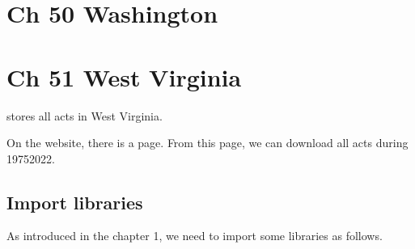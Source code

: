 \documentclass[letterpaper,10pt,english]{jupyterBook}
\begin{document}
\chapter{Ch 50 Washington}
\label{\detokenize{ch50:ch-50-washington}}\label{\detokenize{ch50::doc}}
\sphinxstepscope


\chapter{Ch 51 West Virginia}
\label{\detokenize{ch51:ch-51-west-virginia}}\label{\detokenize{ch51::doc}}
\sphinxAtStartPar
{} stores all acts in West Virginia.

\sphinxAtStartPar
{}

\sphinxAtStartPar
On the website, there is a  page. From this page, we can download all acts during 1975\sphinxhyphen{}2022.

\sphinxAtStartPar
{}


\section{Import libraries}
\label{\detokenize{ch51:import-libraries}}
\sphinxAtStartPar
As introduced in the chapter 1, we need to import some libraries as follows.
\end{document}
